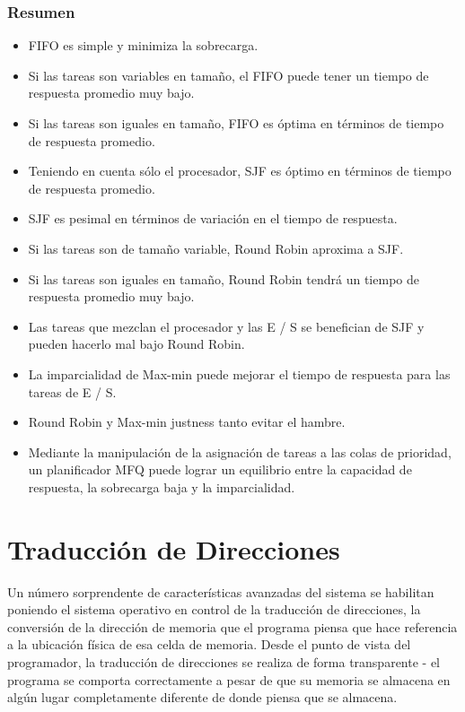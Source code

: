 \documentclass[10pt]{book}
\begin{document}
\subsection{Resumen}
\begin{itemize}
\item FIFO es simple y minimiza la sobrecarga.
\item Si las tareas son variables en tamaño, el FIFO puede tener un tiempo de respuesta promedio muy bajo.
\item Si las tareas son iguales en tamaño, FIFO es óptima en términos de tiempo de respuesta promedio.
\item Teniendo en cuenta sólo el procesador, SJF es óptimo en términos de tiempo de respuesta promedio.
\item SJF es pesimal en términos de variación en el tiempo de respuesta.
\item Si las tareas son de tamaño variable, Round Robin aproxima a SJF.
\item Si las tareas son iguales en tamaño, Round Robin tendrá un tiempo de respuesta promedio muy bajo.
\item Las tareas que mezclan el procesador y las E / S se benefician de SJF y pueden hacerlo mal bajo Round Robin.
\item La imparcialidad de Max-min puede mejorar el tiempo de respuesta para las tareas de E / S.
\item Round Robin y Max-min justness tanto evitar el hambre.
\item Mediante la manipulación de la asignación de tareas a las colas de prioridad, un planificador MFQ puede lograr un equilibrio entre la capacidad de respuesta, la sobrecarga baja y la imparcialidad.
\end{itemize}

\chapter{Traducción de Direcciones}
Un número sorprendente de características avanzadas del sistema se habilitan poniendo el sistema operativo en control de la traducción de direcciones, la conversión de la dirección de memoria que el programa piensa que hace referencia a la ubicación física de esa celda de memoria. Desde el punto de vista del programador, la traducción de direcciones se realiza de forma transparente - el programa se comporta correctamente a pesar de que su memoria se almacena en algún lugar completamente diferente de donde piensa que se almacena.
\end{document}

